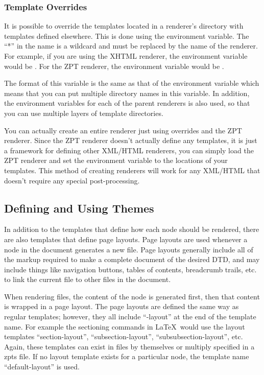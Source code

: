 \subsubsection{Template Overrides\label{sec:tmploverrides}}

It is possible to override the templates located in a renderer's directory
with templates defined elsewhere.  This is done using the 
 environment variable.  The ``*'' in the name
 is a wildcard and must be replaced by the name of the
renderer.  For example, if you are using the XHTML renderer, the 
environment variable would be .  For the ZPT
renderer, the environment variable would be .

The format of this variable is the same as that of the 
environment variable which means that you can put multiple directory 
names in this variable.  In addition, the environment variables for 
each of the parent renderers is also used, so that you can use
multiple layers of template directories.

You can actually create an entire renderer just using overrides and the
ZPT renderer.  Since the ZPT renderer doesn't actually define any templates,
it is just a framework for defining other XML/HTML renderers, you can
simply load the ZPT renderer and set the  environment
variable to the locations of your templates.  This method of creating 
renderers will work for any XML/HTML that doesn't require any special
post-processing.


\subsection{Defining and Using Themes}

In addition to the templates that define how each node should be rendered,
there are also templates that define page layouts.  Page layouts are used
whenever a node in the document generates a new file.   Page layouts 
generally include all of the markup required to make a complete document
of the desired DTD, and may include things like navigation buttons,
tables of contents, breadcrumb trails, etc. to link the current file to
other files in the document. 

When rendering files, the content of the
node is generated first, then that content is wrapped in a page layout.
The page layouts are defined the same way as regular templates; however,
they all include ``-layout'' at the end of the template name.  For 
example the sectioning commands in \LaTeX\ would use the layout templates
``section-layout'', ``subsection-layout'', ``subsubsection-layout'', etc.
Again, these templates can exist in files by themselves or multiply 
specified in a zpts file.  If no layout template exists for a particular
node, the template name ``default-layout'' is used.

